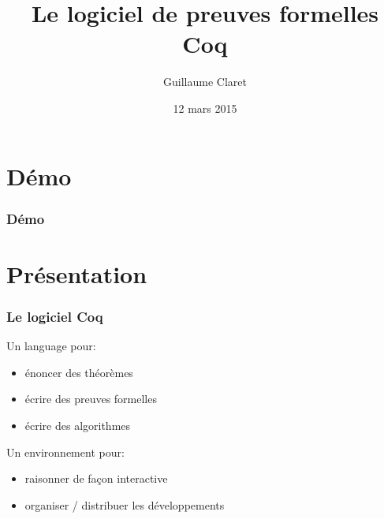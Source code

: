 \documentclass[hyperref={pdfpagelabels=false}]{beamer}
\begin{document}
\title{Le logiciel de preuves formelles Coq}
\author{Guillaume Claret}
\date{12 mars 2015}
\maketitle

\section{Démo}
{
  \begin{frame}[plain]
    \frametitle{Démo}
  \end{frame}
}

\section{Présentation}
\begin{frame}
  \frametitle{Le logiciel Coq}
  Un language pour:
  \begin{itemize}
    \item énoncer des théorèmes
    \item écrire des preuves formelles
    \item écrire des algorithmes
  \end{itemize}

  Un environnement pour:
  \begin{itemize}
    \item raisonner de façon interactive
    \item organiser / distribuer les développements
  \end{itemize}
\end{frame}
\end{document}
